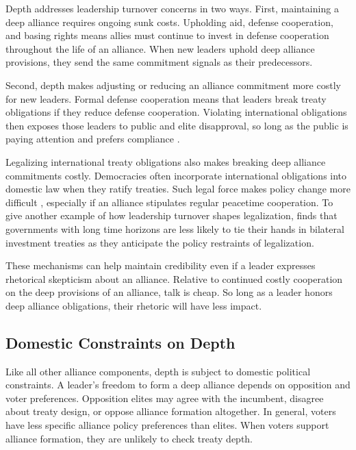 \documentclass[12pt]{article}
\begin{document}
Depth addresses leadership turnover concerns in two ways. 
First, maintaining a deep alliance requires ongoing sunk costs.
Upholding aid, defense cooperation, and basing rights means allies must continue to invest in defense cooperation throughout the life of an alliance. 
When new leaders uphold deep alliance provisions, they send the same commitment signals as their predecessors. 


Second, depth makes adjusting or reducing an alliance commitment more costly for new leaders. 
Formal defense cooperation means that leaders break treaty obligations if they reduce defense cooperation. 
Violating international obligations then exposes those leaders to public and elite disapproval, so long as the public is paying attention \citep{Slantchev2006, PotterBaum2014} and prefers compliance \citep{Chaudoin2014, KertzerBrutger2016}.


Legalizing international treaty obligations also makes breaking deep alliance commitments costly. 
Democracies often incorporate international obligations into domestic law when they ratify treaties.
Such legal force makes policy change more difficult \citep{Gaubatz1996, Leedsetal2009}, especially if an alliance stipulates regular peacetime cooperation. 
To give another example of how leadership turnover shapes legalization, \citet{Blake2013} finds that governments with long time horizons are less likely to tie their hands in bilateral investment treaties as they anticipate the policy restraints of legalization. 


These mechanisms can help maintain credibility even if a leader expresses rhetorical skepticism about an alliance. 
Relative to continued costly cooperation on the deep provisions of an alliance, talk is cheap. 
So long as a leader honors deep alliance obligations, their rhetoric will have less impact. 



\subsection{Domestic Constraints on Depth} 

Like all other alliance components, depth is subject to domestic political constraints. 
A leader's freedom to form a deep alliance depends on opposition and voter preferences.
Opposition elites may agree with the incumbent, disagree about treaty design, or oppose alliance formation altogether. 
In general, voters have less specific alliance policy preferences than elites. 
When voters support alliance formation, they are unlikely to check treaty depth.
\end{document}
